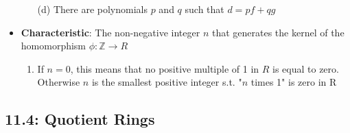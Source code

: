 \documentclass[12pt]{article}
\begin{document}
\begin{itemize}
\begin{enumerate}
    \item[(d)] There are polynomials $p$ and $q$ such that $d = pf + qg$
  \end{enumerate}
  \item \textbf{Characteristic}: The non-negative integer $n$ that generates the kernel of the homomorphism $\phi: \mathbb{Z} \to R$
  \begin{enumerate}
    \item If $n = 0$, this means that no positive multiple of 1 in $R$ is equal to zero. Otherwise $n$ is the smallest positive integer s.t. "$n$ times 1" is zero in R
  \end{enumerate}
\end{itemize}

\subsection*{11.4: Quotient Rings}
\end{document}

